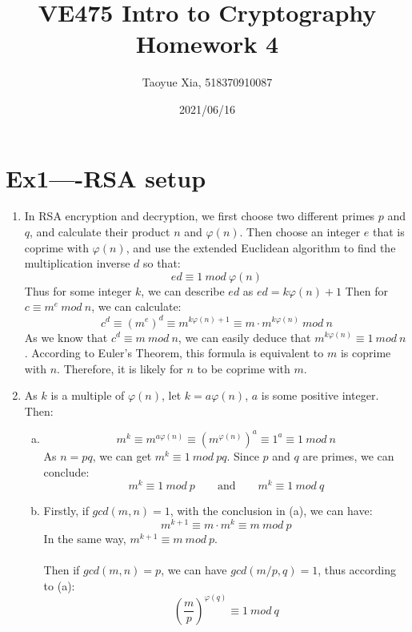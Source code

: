\documentclass[12pt, a4paper]{article}
\begin{document}
\title{VE475 Intro to Cryptography Homework 4}
\author{Taoyue Xia, 518370910087}
\date{2021/06/16}
\maketitle

\section*{Ex1----RSA setup}
\begin{enumerate}
    \item In RSA encryption and decryption, we first choose two different primes $p$ and $q$, 
          and calculate their product $n$ and $\varphi(n)$.\newline
          Then choose an integer $e$ that is coprime with $\varphi(n)$, and use the extended Euclidean algorithm 
          to find the multiplication inverse $d$ so that: 
          $$ed \equiv 1\ mod\ \varphi(n)$$
          Thus for some integer $k$, we can describe $ed$ as $ed = k\varphi(n) + 1$
          Then for $c \equiv m^e\ mod\ n$, we can calculate:
          $$c^d \equiv (m^e)^d \equiv m^{k\varphi(n) + 1} \equiv m\cdot m^{k\varphi(n)}\ mod\ n$$
          As we know that $c^d \equiv m\ mod\ n$, we can easily deduce that $m^{k\varphi(n)} \equiv 1\ mod\ n$. 
          According to Euler's Theorem, this formula is equivalent to $m$ is coprime with $n$. Therefore, 
          it is likely for $n$ to be coprime with $m$.
    \item As $k$ is a multiple of $\varphi(n)$, let $k = a\varphi(n)$, $a$ is some positive integer. Then:
          \begin{enumerate}[(a)]
              \item $$m^k \equiv m^{a\varphi(n)} \equiv (m^{\varphi(n)})^a \equiv 1^a \equiv 1\ mod\ n$$
                    As $n = pq$, we can get $m^k \equiv 1\ mod\ pq$. Since $p$ and $q$ are primes, we can conclude:
                    $$m^k \equiv 1\ mod\ p \qquad \text{and} \qquad m^k \equiv 1\ mod\ q$$
              \item Firstly, if $gcd(m,n) = 1$, with the conclusion in (a), we can have:
                    $$m^{k+1} \equiv m\cdot m^k \equiv m\ mod\ p$$
                    In the same way, $m^{k+1} \equiv m\ mod\ p$.\\
                    \\
                    Then if $gcd(m,n) = p$, we can have $gcd(m/p, q) = 1$, thus according to (a):
                    $$(\frac{m}{p})^{\varphi(q)} \equiv 1\ mod\ q$$

\end{enumerate}
\end{enumerate}
\end{document}
